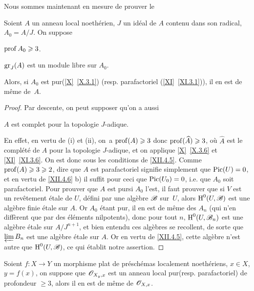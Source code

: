 Nous sommes maintenant en mesure de prouver le
\enlargethispage{-1\baselineskip}%
\begin{theoreme} \label{XII.4.7}
Soient $A$ un anneau local noeth\'erien, $J$ un id\'eal de $A$ contenu dans son radical, $A_0=A/J$. On suppose
\begin{enumeratei}
\item
$\operatorname{prof} A_0\geqslant 3$.
\item
$\operatorname{gr}_J(A)$ est un module libre sur $A_0$.
\end{enumeratei}
\noindent
Alors, si $A_0$ est \og pur\fg (\ref{X}~\ref{X.3.1}) (resp. parafactoriel (\ref{XI}~\ref{XI.3.1})), il en est de m\^eme de~$A$.
\end{theoreme}

\begin{proof}
Par descente, on peut supposer qu'on a aussi
\begin{enumeratei}\setcounter{enumi}{2}
\item
$A$ est complet pour la topologie $J$-adique.
\end{enumeratei}

En effet, en vertu de (i) et (ii), on~a $\operatorname{prof}(A)\geqslant 3$ donc $\operatorname{prof}(\widehat{A})\geqslant 3$, o\`u $\widehat{A}$ est le compl\'et\'e de $A$ pour la topologie $J$-adique, et on applique \ref{X}~\ref{X.3.6} et \ref{XI}~\ref{XI.3.6}. On est donc sous les conditions de \ref{XII.4.5}. Comme $\operatorname{prof}(A)\geqslant 3\geqslant 2$, dire que $A$ est parafactoriel signifie simplement que $\operatorname{Pic}(U)=0$, et en vertu de \ref{XII.4.6} b) il suffit pour ceci que $\operatorname{Pic}(U_0)=0$, i.e. que $A_0$ soit parafactoriel. Pour prouver que $A$ est \og pur\fg si $A_0$ l'est, il faut prouver que si $V$ est un rev\^etement \'etale de $U$, d\'efini par une alg\`ebre ${\mathscr B}$ sur~$U$, alors $\operatorname{H}^0(U, {\mathscr B})$ est une alg\`ebre finie \'etale sur $A$. Or $A_0$ \'etant pur, il en est de m\^eme des $A_n$ (qui n'en diff\`erent que par des \'el\'ements nilpotents), donc pour tout $n$, $\operatorname{H}^0(U, {\mathscr B}_n)$ est une alg\`ebre \'etale sur $A/J^{n+1}$, et bien entendu ces alg\`ebres se recollent, de sorte que $\varprojlim B_n$ est une alg\`ebre \'etale sur $A$. Or en vertu de \ref{XII.4.5}, cette alg\`ebre n'est autre que $\operatorname{H}^0(U, {\mathscr B})$, ce qui \'etablit notre assertion.
\skipqed
\end{proof}

\begin{corollaire} \label{XII.4.8}
Soient $f:X\to Y$ un morphisme plat de pr\'esch\'emas localement noeth\'eriens, $x\in X$, $y=f(x)$, on suppose que ${\mathscr O}_{X_y, x}$ est un anneau local \og pur\fg (resp. parafactoriel) de profondeur $\geq 3$, alors il en est de m\^eme de ${\mathscr O}_{X, x}$.
\end{corollaire}

